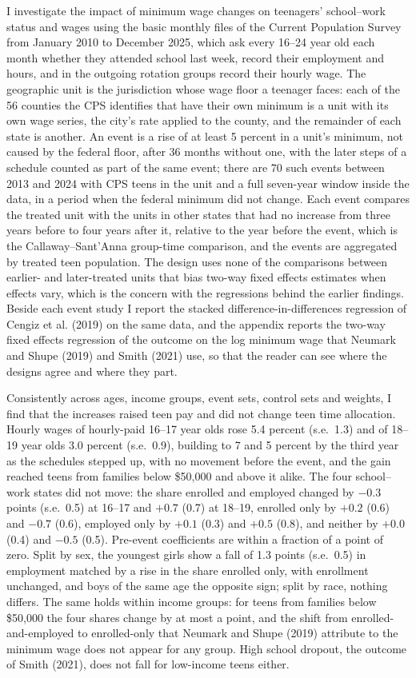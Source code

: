 \documentclass[12pt]{article}
\begin{document}
I investigate the impact of minimum wage changes on teenagers' school--work status and wages using the basic monthly files of the Current Population Survey from January 2010 to December 2025, which ask every 16--24 year old each month whether they attended school last week, record their employment and hours, and in the outgoing rotation groups record their hourly wage. The geographic unit is the jurisdiction whose wage floor a teenager faces: each of the 56 counties the CPS identifies that have their own minimum is a unit with its own wage series, the city's rate applied to the county, and the remainder of each state is another. An event is a rise of at least 5 percent in a unit's minimum, not caused by the federal floor, after 36 months without one, with the later steps of a schedule counted as part of the same event; there are 70 such events between 2013 and 2024 with CPS teens in the unit and a full seven-year window inside the data, in a period when the federal minimum did not change. Each event compares the treated unit with the units in other states that had no increase from three years before to four years after it, relative to the year before the event, which is the Callaway--Sant'Anna group-time comparison, and the events are aggregated by treated teen population. The design uses none of the comparisons between earlier- and later-treated units that bias two-way fixed effects estimates when effects vary, which is the concern with the regressions behind the earlier findings. Beside each event study I report the stacked difference-in-differences regression of Cengiz et al. (2019) on the same data, and the appendix reports the two-way fixed effects regression of the outcome on the log minimum wage that Neumark and Shupe (2019) and Smith (2021) use, so that the reader can see where the designs agree and where they part.

Consistently across ages, income groups, event sets, control sets and weights, I find that the increases raised teen pay and did not change teen time allocation. Hourly wages of hourly-paid 16--17 year olds rose 5.4 percent (s.e.\ 1.3) and of 18--19 year olds 3.0 percent (s.e.\ 0.9), building to 7 and 5 percent by the third year as the schedules stepped up, with no movement before the event, and the gain reached teens from families below \$50,000 and above it alike. The four school--work states did not move: the share enrolled and employed changed by $-0.3$ points (s.e.\ 0.5) at 16--17 and $+0.7$ (0.7) at 18--19, enrolled only by $+0.2$ (0.6) and $-0.7$ (0.6), employed only by $+0.1$ (0.3) and $+0.5$ (0.8), and neither by $+0.0$ (0.4) and $-0.5$ (0.5). Pre-event coefficients are within a fraction of a point of zero. Split by sex, the youngest girls show a fall of 1.3 points (s.e.\ 0.5) in employment matched by a rise in the share enrolled only, with enrollment unchanged, and boys of the same age the opposite sign; split by race, nothing differs. The same holds within income groups: for teens from families below \$50,000 the four shares change by at most a point, and the shift from enrolled-and-employed to enrolled-only that Neumark and Shupe (2019) attribute to the minimum wage does not appear for any group. High school dropout, the outcome of Smith (2021), does not fall for low-income teens either.
\end{document}
